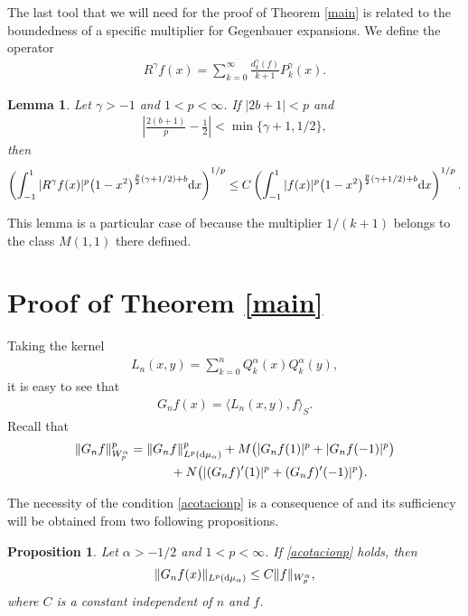 \documentclass[11pt]{article}
\newtheorem{lem}[thm]{Lemma}
\newtheorem{propo}[thm]{Proposition}
\numberwithin{equation}{section}
\begin{document}
The last tool that we will need for the proof of Theorem \ref{main} is related to the boundedness of a specific multiplier for Gegenbauer expansions. We define the operator
\begin{gather*}
R^\gamma f(x)=\sum_{k=0}^\infty \frac{d_k^\gamma(f)}{k+1}P_{k}^\gamma(x).
\end{gather*}
\begin{lem}\label{lem:muck}
Let $\gamma>-1$ and $1<p<\infty$. If $|2b+1|<p$ and
\begin{gather*}
\left|\frac{2(b+1)}{p}-\frac{1}{2}\right|<\min\{\gamma+1,1/2\},
\end{gather*}
then	
	\begin{gather*}%
	\left(\int_{-1}^{1}|R^\gamma f(x)|^p\big(1-x^2\big)^{\frac{p}{2}(\gamma+1/2)+b} {\rm d}x\right)^{1/p} \le C\left(\int_{-1}^{1}|f(x)|^p\big(1-x^2\big)^{\frac{p}{2}(\gamma+1/2)+b} {\rm d}x\right)^{1/p}.
	\end{gather*}
\end{lem}

This lemma is a particular case of \cite[Theorem~1.10]{muckenhoupt} because the multiplier $1/(k+1)$ belongs to the class $M(1,1)$ there defined.

\section{Proof of Theorem \ref{main}}\label{section3}
Taking the kernel
\begin{gather*}
L_n(x,y)=\sum_{k=0}^n Q_k^{\alpha}(x)Q_k^{\alpha}(y),
\end{gather*}
it is easy to see that
\begin{gather*}
G_nf(x)=\langle L_n(x,y),f\rangle_S.
\end{gather*}
Recall that
\begin{gather*}
\|G_nf\|_{W_p^{\alpha}}^p=\|G_nf\|_{L^p({\rm d}\mu_{\alpha})}^p+M\big(|G_nf(1)|^p+|G_nf(-1)|^p\big)\\
\hphantom{\|G_nf\|_{W_p^{\alpha}}^p=}{} +N\big(|(G_nf)'(1)|^p+(G_nf)'(-1)|^p\big).
\end{gather*}

The necessity of the condition \eqref{acotacionp} is a consequence of \cite[Theorem 1]{Fejzullahu} and its sufficiency will be obtained from two following propositions.
\begin{propo}\label{prop1} Let $\alpha>-1/2$ and $1<p<\infty$. If \eqref{acotacionp} holds, then
	\begin{gather}\label{des-1}
	\|G_nf(x)\|_{L^p({\rm d}\mu_{\alpha})}\le C\|f\|_{{W_p^{\alpha}}},
	\end{gather}
where $C$ is a constant independent of $n$ and $f$.
\end{propo}
\end{document}
